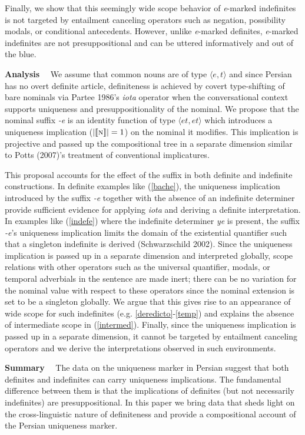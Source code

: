 \documentclass [11pt] {article}
\begin{document}
Finally, we show that this seemingly wide scope behavior of \emph{e}-marked indefinites is not targeted by entailment canceling operators such as negation, possibility modals, or conditional antecedents. However, unlike \emph{e}-marked definites, \emph{e}-marked indefinites are not presuppositional and can be uttered informatively and out of the blue.

\textbf{Analysis} ~~We assume that common nouns are of type $\langle e,t\rangle$ and since Persian has no overt definite article, definiteness is achieved by covert type-shifting of bare nominals via Partee 1986's \emph{iota} operator when the conversational context supports uniqueness and presuppositionality of the nominal. We propose that the nominal suffix \emph{-e} is an identity function of type $\langle et,et\rangle$ which introduces a uniqueness implication ($| \llbracket \textsc{n} \rrbracket | = 1$) on the nominal it modifies. This implication is projective and passed up the compositional tree in a separate dimension similar to Potts (2007)'s treatment of conventional implicatures. 

This proposal accounts for the effect of the suffix in both definite and indefinite constructions. In definite examples like (\ref{bache}), the uniqueness implication introduced by the suffix \emph{-e} together with the absence of an indefinite determiner provide sufficient evidence for applying \emph{iota} and deriving a definite interpretation. In examples like (\ref {indefe}) where the indefinite determiner  \emph{ye} is present, the suffix \emph{-e}'s uniqueness implication limits the domain of the existential quantifier such that a singleton indefinite is derived (Schwarzschild 2002). Since the uniqueness implication is passed up in a separate dimension and interpreted globally, scope relations with other operators such as the universal quantifier, modals, or temporal adverbials in the sentence are made inert; there can be no variation for the nominal value with respect to these operators since the nominal extension is set to be a singleton globally. We argue that this gives rise to an appearance of wide scope for such indefinites (e.g. \ref{deredicto}-\ref{temp}) and explains the absence of intermediate scope in (\ref {intermed}). Finally, since the uniqueness implication is passed up in a separate dimension, it cannot be targeted by entailment canceling operators and we derive the interpretations observed in such environments. 

\textbf{Summary} ~~The data on the uniqueness marker in Persian suggest that both definites and indefinites can carry uniqueness implications. The fundamental difference between them is that the implications of definites (but not necessarily indefinites) are presuppositional. In this paper we bring data that sheds light on the cross-linguistic nature of definiteness and provide a compositional account of the Persian uniqueness marker.
\end{document}
